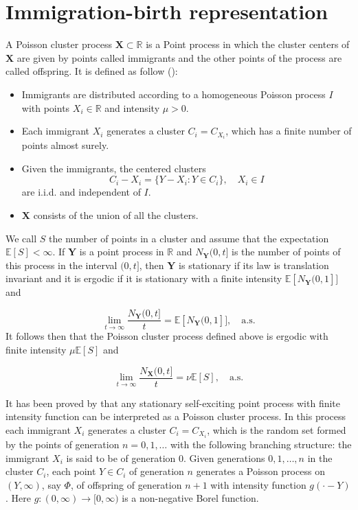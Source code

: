 \documentclass[11pt,a4paper]{article}
\begin{document}
\section{Immigration-birth representation} \label{ch:immi}

A Poisson cluster process $\bm{X} \subset \mathbb{R}$ is a Point process in which the cluster centers of $\bm{X}$ are given by points called immigrants and the other points of the process are called offspring. It is defined as follow (\cite{Bordenave}):
\begin{itemize}
    \item Immigrants are distributed according to a homogeneous Poisson process $I$ with points $X_i \in \mathbb{R}$ and intensity $\mu > 0$.
    \item Each immigrant $X_i$ generates a cluster $C_i = C_{X_i}$, which has a finite number of points almost surely.
    \item Given the immigrants, the centered clusters 
    \begin{equation*}
        C_i - X_i = \{Y - X_i: Y \in C_i\}, \quad X_i \in I
    \end{equation*}
    are i.i.d. and independent of $I$.
    \item $\bm{X}$ consists of the union of all the clusters.
\end{itemize}

We call $S$ the number of points in a cluster and assume that the expectation $\mathbb{E}[S] < \infty$. If $\bm{Y}$ is a point process in $\mathbb{R}$ and $N_{\bm{Y}}(0, t]$ is the number of points of this process in the interval $(0, t]$, then $\bm{Y}$ is stationary if its law is translation invariant and it is ergodic if it is stationary with a finite intensity $\mathbb{E}[N_{\bm{Y}}(0, 1]]$ and

\begin{equation*}
    \lim_{t \rightarrow \infty} \frac{N_{\bm{Y}}(0, t]}{t} = \mathbb{E}[N_{\bm{Y}}(0, 1]], \quad \text{a.s.}
\end{equation*}
It follows then that the Poisson cluster process defined above is ergodic with finite intensity $\mu \mathbb{E}[S]$ and

\begin{equation*}
    \lim_{t \rightarrow \infty} \frac{N_{\bm{X}}(0, t]}{t} = \nu\mathbb{E}[S], \quad \text{a.s.}
\end{equation*}

It has been proved by \cite{Hawkes74} that any stationary self-exciting point process with finite intensity function can be interpreted as a Poisson cluster process. In this process each immigrant $X_i$ generates a cluster $C_i = C_{X_i}$, which is the random set formed by the points of generation $n = 0, 1, \dots$ with the following branching structure: the immigrant $X_i$ is said to be of generation $0$. Given generations $0, 1, \dots, n$ in the cluster $C_i$, each point $Y \in C_i$ of generation $n$ generates a Poisson process on $(Y, \infty)$, say $\Phi$, of offspring of generation $n+1$ with intensity function $g(\cdot - Y)$. Here $g:(0, \infty) \rightarrow [0, \infty)$ is a non-negative Borel function.
\end{document}
